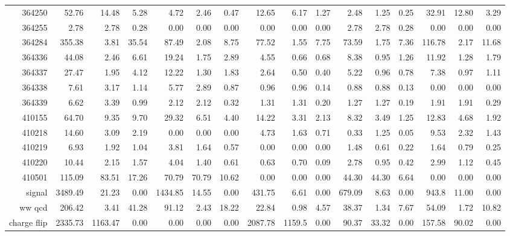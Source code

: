 \begin{sidewaystable}[!htbp]
{\begin{tabular}{r|rrr|rrr|rrr|rrr|rrr}
      364250&52.76&14.48&5.28&4.72&2.46&0.47&12.65&6.17&1.27&2.48&1.25&0.25&32.91&12.80&3.29\\
      
      364255&2.78&2.78&0.28&0.00&0.00&0.00&0.00&0.00&0.00&2.78&2.78&0.28&0.00&0.00&0.00\\
      
      364284&355.38&3.81&35.54&87.49&2.08&8.75&77.52&1.55&7.75&73.59&1.75&7.36&116.78&2.17&11.68\\
      
      364336&44.08&2.46&6.61&19.24&1.75&2.89&4.55&0.66&0.68&8.38&0.95&1.26&11.92&1.28&1.79\\
      
      364337&27.47&1.95&4.12&12.22&1.30&1.83&2.64&0.50&0.40&5.22&0.96&0.78&7.38&0.97&1.11\\
      
      364338&7.61&3.17&1.14&5.77&2.89&0.87&0.96&0.96&0.14&0.88&0.88&0.13&0.00&0.00&0.00\\
      
      364339&6.62&3.39&0.99&2.12&2.12&0.32&1.31&1.31&0.20&1.27&1.27&0.19&1.91&1.91&0.29\\
      
      410155&64.70&9.35&9.70&29.32&6.51&4.40&14.22&3.31&2.13&8.32&3.49&1.25&12.83&4.68&1.92\\
      
      410218&14.60&3.09&2.19&0.00&0.00&0.00&4.73&1.63&0.71&0.33&1.25&0.05&9.53&2.32&1.43\\
      
      410219&6.93&1.92&1.04&3.81&1.64&0.57&0.00&0.00&0.00&1.48&0.61&0.22&1.64&0.79&0.25\\
      
      410220&10.44&2.15&1.57&4.04&1.40&0.61&0.63&0.70&0.09&2.78&0.95&0.42&2.99&1.12&0.45\\
      
      410501&115.09&83.51&17.26&70.79&70.79&10.62&0.00&0.00&0.00&44.30&44.30&6.64&0.00&0.00&0.00\\
      \hline\hline
      signal&3489.49&21.23&0.00&1434.85&14.55&0.00&431.75&6.61&0.00&679.09&8.63&0.00&943.8&11.00&0.00\\

      ww qcd&206.42&3.41&41.28&91.12&2.43&18.22&22.84&0.98&4.57&38.37&1.34&7.67&54.09&1.72&10.82\\

      charge flip&2335.73&1163.47&0.00&0.00&0.00&0.00&2087.78&1159.5&0.00&90.37&33.32&0.00&157.58&90.02&0.00\\


\end{tabular}}
\end{sidewaystable}
